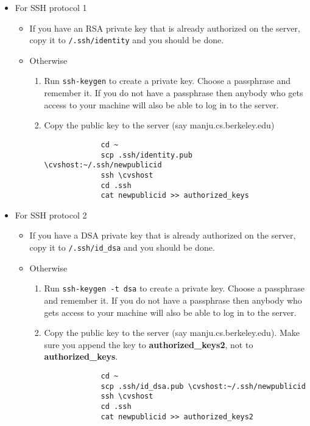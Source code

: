 \documentclass{article}
\def\t#1{{\tt #1}}
\def\cvshost{manju}
\begin{document}
\begin{itemize}
\item For SSH protocol 1
  \begin{itemize}
  \item If you have an RSA private key that is already authorized on 
        the server, copy it to \t{\home{}/.ssh/identity} and you 
        should be done.
  \item Otherwise
     \begin{enumerate}
       \item Run \t{ssh-keygen} to create a private key. 
        Choose a passphrase and
        remember it. If you do not have a passphrase then anybody who gets
        access to your machine will also be able to log in to the server.
       \item Copy the public key to the server (say \cvshost.cs.berkeley.edu)
             \begin{verbatim}
             cd ~
             scp .ssh/identity.pub \cvshost:~/.ssh/newpublicid
             ssh \cvshost
             cd .ssh
             cat newpublicid >> authorized_keys
             \end{verbatim}
    \end{enumerate}
  \end{itemize}
 
\item For SSH protocol 2

  \begin{itemize}
  \item If you have a DSA private key that is already authorized on 
        the server, copy it to \t{\home{}/.ssh/id\_dsa} and you 
        should be done.
  \item Otherwise
     \begin{enumerate}
       \item Run \t{ssh-keygen -t dsa} to create a private key. 
        Choose a passphrase and remember it. 
        If you do not have a passphrase then anybody who gets
        access to your machine will also be able to log in to the server.
       \item Copy the public key to the server (say \cvshost.cs.berkeley.edu).
          Make sure you append the key to {\bf authorized\_keys2}, not to {\bf
          authorized\_keys}.  
             \begin{verbatim}
             cd ~
             scp .ssh/id_dsa.pub \cvshost:~/.ssh/newpublicid
             ssh \cvshost
             cd .ssh
             cat newpublicid >> authorized_keys2
             \end{verbatim}
     \end{enumerate}
  \end{itemize}



\end{itemize}
\end{document}
